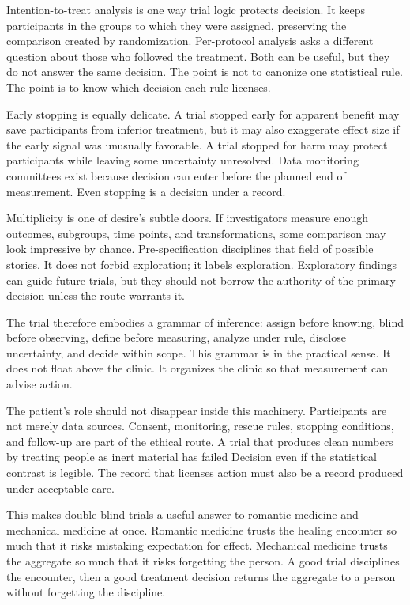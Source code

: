 Intention-to-treat analysis is one way trial logic protects decision. It keeps
participants in the groups to which they were assigned, preserving the
comparison created by randomization. Per-protocol analysis asks a different
question about those who followed the treatment. Both can be useful, but they
do not answer the same decision. The point is not to canonize one statistical
rule. The point is to know which decision each rule licenses.

Early stopping is equally delicate. A trial stopped early for apparent benefit
may save participants from inferior treatment, but it may also exaggerate
effect size if the early signal was unusually favorable. A trial stopped for
harm may protect participants while leaving some uncertainty unresolved. Data
monitoring committees exist because decision can enter before the planned end
of measurement. Even stopping is a decision under a record.

Multiplicity is one of desire's subtle doors. If investigators measure enough
outcomes, subgroups, time points, and transformations, some comparison may
look impressive by chance. Pre-specification disciplines that field of
possible stories. It does not forbid exploration; it labels exploration.
Exploratory findings can guide future trials, but they should not borrow the
authority of the primary decision unless the route warrants it.

The trial therefore embodies a grammar of inference: assign before knowing,
blind before observing, define before measuring, analyze under rule, disclose
uncertainty, and decide within scope. This grammar is  in the
practical sense. It does not float above the clinic. It organizes
the clinic so that measurement can advise action.

The patient's role should not disappear inside this machinery. Participants
are not merely data sources. Consent, monitoring, rescue rules, stopping
conditions, and follow-up are part of the ethical route. A trial that produces
clean numbers by treating people as inert material has failed Decision even
if the statistical contrast is legible. The record that licenses action must
also be a record produced under acceptable care.

This makes double-blind trials a useful answer to romantic medicine and
mechanical medicine at once. Romantic medicine trusts the healing encounter
so much that it risks mistaking expectation for effect. Mechanical medicine
trusts the aggregate so much that it risks forgetting the person. A good trial
disciplines the encounter, then a good treatment decision returns the
aggregate to a person without forgetting the discipline.

